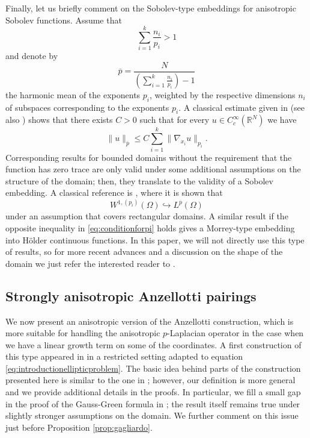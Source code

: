 \documentclass[reqno,12pt]{amsart}
\def\R{\mathbb R}
\numberwithin{equation}{section}
\begin{document}
Finally, let us briefly comment on the Sobolev-type embeddings for anisotropic Sobolev functions. Assume that
\begin{equation}\label{eq:conditionforpi}
\sum_{i = 1}^k \frac{n_i}{p_i} > 1
\end{equation}
and denote by
\begin{equation}
\overline{p} = \frac{N}{(\sum_{i = 1}^k \frac{n_i}{p_i}) - 1}
\end{equation}
the harmonic mean of the exponents $p_i$, weighted by the respective dimensions $n_i$ of subspaces corresponding to the exponents $p_i$. A classical estimate given in \cite{Tro} (see also \cite{Ada}) shows that there exists $C > 0$ such that for every $u \in C_c^\infty(\R^N)$ we have
\begin{equation}
\| u \|_{\overline{p}} \leq C \sum_{i = 1}^k \| \nabla_{x_i} u \|_{p_i}.
\end{equation}
Corresponding results for bounded domains without the requirement that the function has zero trace are only valid under some additional assumptions on the structure of the domain; then, they translate to the validity of a Sobolev embedding. A classical reference is \cite{KK}, where it is shown that
\begin{equation}
W^{1,(p_i)}(\Omega) \hookrightarrow L^{\overline{p}}(\Omega)
\end{equation}
under an assumption that covers rectangular domains. A similar result if the opposite inequality in \eqref{eq:conditionforpi} holds gives a Morrey-type embedding into H\"older continuous functions. In this paper, we will not directly use this type of results, so for more recent advances and a discussion on the shape of the domain we just refer the interested reader to \cite{FGK,Rak1,Rak2}.



\subsection{Strongly anisotropic Anzellotti pairings}

We now present an anisotropic version of the Anzellotti construction, which is more suitable for handling the anisotropic $p$-Laplacian operator in the case when we have a linear growth term on some of the coordinates. A first construction of this type appeared in \cite{MRST} in a restricted setting adapted to equation \eqref{eq:introductionellipticproblem}. The basic idea behind parts of the construction presented here is similar to the one in \cite{MRST}; however, our definition is more general and we provide additional details in the proofs. In particular, we fill a small gap in the proof of the Gauss-Green formula in \cite{MRST}; the result itself remains true under slightly stronger assumptions on the domain. We further comment on this issue just before Proposition \ref{prop:gagliardo}.
\end{document}
